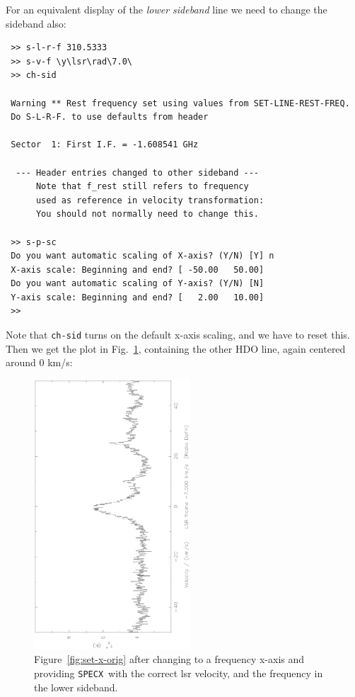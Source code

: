 \documentclass[11pt,twoside]{article}
\newcommand{\SPECX}{{\tt SPECX}}
\begin{document}
For an equivalent display of the {\it lower sideband} line we need to
change the sideband also:
\begin{verbatim}
 >> s-l-r-f 310.5333 
 >> s-v-f \y\lsr\rad\7.0\
 >> ch-sid
 
 Warning ** Rest frequency set using values from SET-LINE-REST-FREQ.
 Do S-L-R-F. to use defaults from header
 
 Sector  1: First I.F. = -1.608541 GHz
 
  --- Header entries changed to other sideband ---
      Note that f_rest still refers to frequency  
      used as reference in velocity transformation:
      You should not normally need to change this.
 
 >> s-p-sc
 Do you want automatic scaling of X-axis? (Y/N) [Y] n
 X-axis scale: Beginning and end? [ -50.00   50.00] 
 Do you want automatic scaling of Y-axis? (Y/N) [N] 
 Y-axis scale: Beginning and end? [   2.00   10.00] 
 >> 
\end{verbatim} 


Note that {\tt ch-sid} turns on the default x-axis scaling, and we
have to reset this.  Then we get the plot in Fig.~\ref{fig:set-to-lsb},
containing the other HDO line, again centered around 0 km/s:

\begin{figure}[ht]
\begin{minipage}[t]{\textwidth}
\begin{minipage}[b]{0.5\textwidth}
\centering
\includegraphics[angle=-90,width=2.3in]{sc8_hdo-lsb.ps}
\end{minipage}
\begin{minipage}[b]{0.45\textwidth}
\caption[Part of the same in the LSB ]
{\small{Figure~\ref{fig:set-x-orig} after changing to a frequency
x-axis and providing \SPECX\ with the correct lsr velocity, and the 
frequency in the lower sideband.
\vspace*{1cm}
}}
\label{fig:set-to-lsb}
\end{minipage}
\end{minipage}
\end{figure}
   
\end{document}
